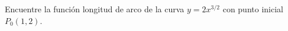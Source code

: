 \item Encuentre la función longitud de arco de la curva $y = 2x^{3/2}$ con punto inicial $P_0(1, 2)$.
